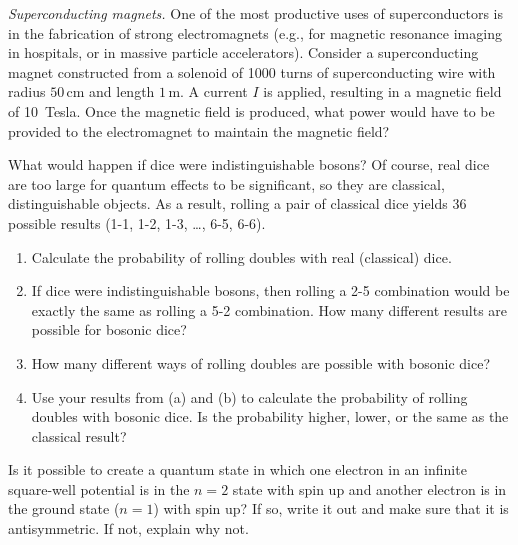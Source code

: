 \begin{problem} 
  {\em Superconducting magnets.}  One of the most productive uses of
  superconductors is in the fabrication of strong electromagnets
  (e.g., for magnetic resonance imaging in hospitals, or in massive
  particle accelerators).  Consider a superconducting magnet
  constructed from a solenoid of 1000 turns of superconducting wire
  with radius $50\, \mbox{cm}$ and length $1\, \mbox{m}$.  A current
  $I$ is applied, resulting in a magnetic field of 10~Tesla.  Once the
  magnetic field is produced, what power would have to be provided to
  the electromagnet to maintain the magnetic field?
\label{prob:superconducting_magnets}
\end{problem}


\begin{problem}
  What would happen if dice were indistinguishable bosons?  Of course,
  real dice are too large for quantum effects to be significant, so
  they are classical, distinguishable objects.  As a result, rolling a
  pair of classical dice yields 36 possible results (1-1, 1-2, 1-3,
  \dots, 6-5, 6-6).
  \begin{enumerate}
  \item Calculate the probability of rolling doubles with real
    (classical) dice.
  \item If dice were indistinguishable bosons, then rolling a 2-5
    combination would be exactly the same as rolling a 5-2
    combination.  How many different results are possible for bosonic
    dice?
  \item How many different ways of rolling doubles are possible with
    bosonic dice?
  \item Use your results from (a) and (b) to calculate the probability
    of rolling doubles with bosonic dice.  Is the probability higher,
    lower, or the same as the classical result?
  \end{enumerate}
\end{problem}



\begin{problem}
  Is it possible to create a quantum state in which one electron in an
  infinite square-well potential is in
  the $n=2$ state with spin up and another
  electron is in the ground state ($n=1$) with
  spin up?  If so, write it out and make sure that it is
  antisymmetric.  If not, explain why not.
\end{problem}


